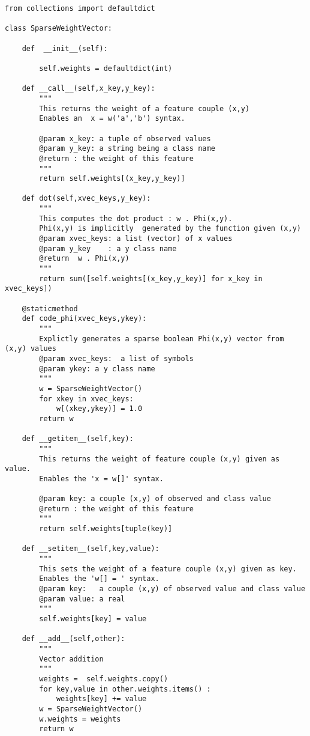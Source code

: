 \documentclass[11pt,openany]{book}
\begin{document}
\begin{verbatim}
from collections import defaultdict

class SparseWeightVector:

    def  __init__(self):
    
        self.weights = defaultdict(int)   

    def __call__(self,x_key,y_key):
        """
        This returns the weight of a feature couple (x,y)
        Enables an  x = w('a','b') syntax.
        
        @param x_key: a tuple of observed values
        @param y_key: a string being a class name
        @return : the weight of this feature
        """
        return self.weights[(x_key,y_key)]

    def dot(self,xvec_keys,y_key):
        """
        This computes the dot product : w . Phi(x,y).
        Phi(x,y) is implicitly  generated by the function given (x,y)
        @param xvec_keys: a list (vector) of x values
        @param y_key    : a y class name
        @return  w . Phi(x,y)
        """
        return sum([self.weights[(x_key,y_key)] for x_key in xvec_keys])
        
    @staticmethod
    def code_phi(xvec_keys,ykey):
        """
        Explictly generates a sparse boolean Phi(x,y) vector from (x,y) values
        @param xvec_keys:  a list of symbols
        @param ykey: a y class name
        """
        w = SparseWeightVector()
        for xkey in xvec_keys:
            w[(xkey,ykey)] = 1.0
        return w

    def __getitem__(self,key):
        """
        This returns the weight of feature couple (x,y) given as value.
        Enables the 'x = w[]' syntax.	
        
        @param key: a couple (x,y) of observed and class value
        @return : the weight of this feature
        """
        return self.weights[tuple(key)]

    def __setitem__(self,key,value):
        """
        This sets the weight of a feature couple (x,y) given as key.
        Enables the 'w[] = ' syntax.	
        @param key:   a couple (x,y) of observed value and class value
        @param value: a real
        """
        self.weights[key] = value

    def __add__(self,other):
	    """
        Vector addition
        """
        weights =  self.weights.copy() 
        for key,value in other.weights.items() :
            weights[key] += value
        w = SparseWeightVector()
        w.weights = weights
        return w
        

\end{verbatim}
\end{document}

